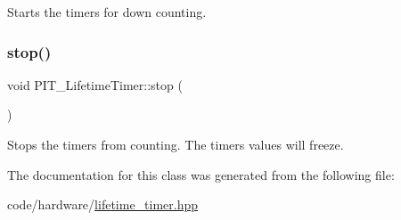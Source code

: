 Starts the timers for down counting. 

\mbox{\label{classPIT__LifetimeTimer_a92543f292044725b1dea4d009e01d9e4}} 
\subsubsection{\texorpdfstring{stop()}{stop()}}
{\footnotesize\ttfamily void P\+I\+T\+\_\+\+Lifetime\+Timer\+::stop (\begin{DoxyParamCaption}{ }\end{DoxyParamCaption})\hspace{0.3cm}{\ttfamily [inline]}}



Stops the timers from counting. The timers values will freeze. 



The documentation for this class was generated from the following file\+:\begin{DoxyCompactItemize}
\item 
code/hardware/\hyperlink{lifetime__timer_8hpp}{lifetime\+\_\+timer.\+hpp}\end{DoxyCompactItemize}
